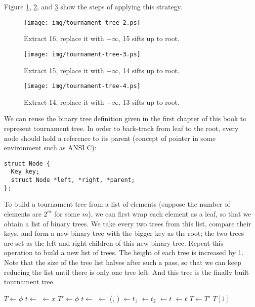 \documentclass[UTF8]{article}
\begin{document}
Figure \ref{fig:tournament-tree-2}, \ref{fig:tournament-tree-3}, and \ref{fig:tournament-tree-4}
show the steps of applying this strategy.

\begin{figure}[htbp]
  \centering
  \texttt{[image: img/tournament-tree-2.ps]}
  \caption{Extract 16, replace it with $-\infty$, 15 sifts up to root.}
  \label{fig:tournament-tree-2}
\end{figure}

\begin{figure}[htbp]
  \centering
  \texttt{[image: img/tournament-tree-3.ps]}
  \caption{Extract 15, replace it with $-\infty$, 14 sifts up to root.}
  \label{fig:tournament-tree-3}
\end{figure}

\begin{figure}[htbp]
  \centering
  \texttt{[image: img/tournament-tree-4.ps]}
  \caption{Extract 14, replace it with $-\infty$, 13 sifts up to root.}
  \label{fig:tournament-tree-4}
\end{figure}

We can reuse the binary tree definition given in the first chapter of this book to represent
tournament tree. In order to back-track from leaf to the root, every node should hold a reference
to its parent (concept of pointer in some environment such as ANSI C):

\lstset{language=C}
\begin{lstlisting}
struct Node {
  Key key;
  struct Node *left, *right, *parent;
};
\end{lstlisting}

To build a tournament tree from a list of elements (suppose the number of elements are $2^m$ for some $m$),
we can first wrap each element as a leaf, so that we obtain a list of binary trees. We take every two
trees from this list, compare their keys, and form a new binary tree with the bigger key as the root;
the two trees are set as the left and right children of this new binary tree. Repeat this operation
to build a new list of trees. The height of each tree is increased by 1. Note that the size of the tree
list halves after such a pass, so that we can keep reducing the list until there is only one tree left.
And this tree is the finally built tournament tree.

\begin{algorithmic}
  \State $T \gets \phi$
    \State $t \gets $ 
    \State {} $\gets x$
    \State {}
  \EndFor
    \State $T' \gets \phi$
      \State $t \gets $ 
      \State {} $\gets$ (, )
      \State {} $\gets t_1$
      \State {} $\gets t_2$
      \State {} $\gets t$
      \State {} $\gets t$
      \State {}
    \EndFor
    \State $T \gets T'$
  \EndWhile
  \State \Return $T[1]$
\EndFunction
\end{algorithmic}
\end{document}
